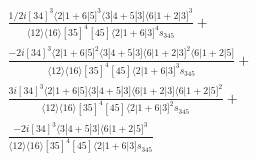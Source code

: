 \documentclass[varwidth, border=5pt]{standalone}
\begin{document}
\begin{my}
$\begin{gathered}
\scriptscriptstyle\frac{1/2i[34]^3⟨2|1+6|5]^3⟨3|4+5|3]⟨6|1+2|3]^3}{⟨12⟩⟨16⟩[35]^4[45]⟨2|1+6|3]^4s_{345}}+\\
\scriptscriptstyle\frac{-2i[34]^3⟨2|1+6|5]^2⟨3|4+5|3]⟨6|1+2|3]^2⟨6|1+2|5]}{⟨12⟩⟨16⟩[35]^4[45]⟨2|1+6|3]^3s_{345}}+\\
\scriptscriptstyle\frac{3i[34]^3⟨2|1+6|5]⟨3|4+5|3]⟨6|1+2|3]⟨6|1+2|5]^2}{⟨12⟩⟨16⟩[35]^4[45]⟨2|1+6|3]^2s_{345}}+\\
\scriptscriptstyle\frac{-2i[34]^3⟨3|4+5|3]⟨6|1+2|5]^3}{⟨12⟩⟨16⟩[35]^4[45]⟨2|1+6|3]s_{345}}\phantom{+}
\end{gathered}$
\end{my}
\end{document}
